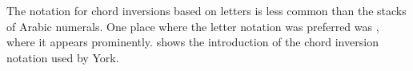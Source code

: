 The notation for chord inversions based on letters is less
common than the stacks of Arabic numerals. One place where
the letter notation was preferred was
\textcite{york1909practical}, where it appears prominently.
 shows the
introduction of the chord inversion notation used by York.


